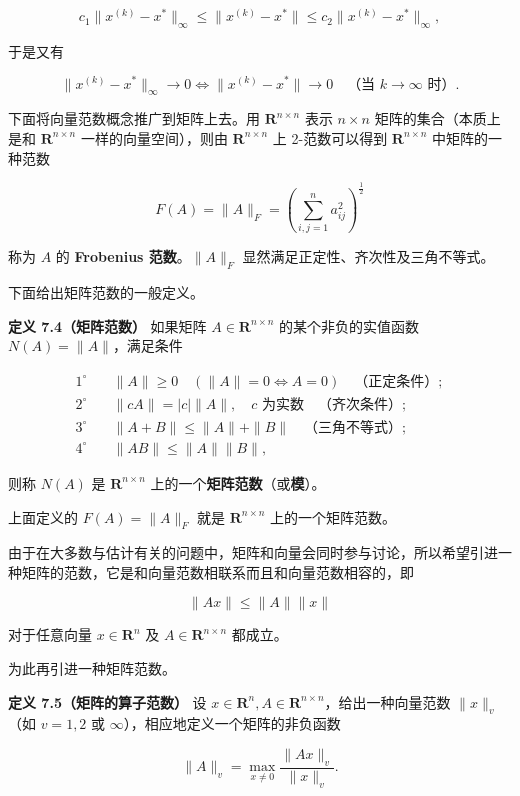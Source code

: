 \[
c_1\|x^{(k)}-x^*\|_\infty\leqslant\|x^{(k)}-x^*\|\leqslant c_2\|x^{(k)}-x^*\|_\infty,
\]

于是又有

\[
\|x^{(k)}-x^*\|_\infty\to0\Longleftrightarrow\|x^{(k)}-x^*\|\to0\quad\text{（当 }k\to\infty\text{ 时）}.
\]

下面将向量范数概念推广到矩阵上去。用 \(\mathbf R^{n\times n}\) 表示 \(n\times n\) 矩阵的集合（本质上是和 \(\mathbf R^{n\times n}\) 一样的向量空间），则由 \(\mathbf R^{n\times n}\) 上 2-范数可以得到 \(\mathbf R^{n\times n}\) 中矩阵的一种范数

\[
F(A)=\|A\|_F=\left(\sum_{i,j=1}^{n}a_{ij}^{2}\right)^{\frac12}
\]

称为 \(A\) 的 \textbf{Frobenius 范数}。\(\|A\|_F\) 显然满足正定性、齐次性及三角不等式。

下面给出矩阵范数的一般定义。

\textbf{定义 7.4（矩阵范数）} 如果矩阵 \(A\in\mathbf R^{n\times n}\) 的某个非负的实值函数 \(N(A)=\|A\|\)，满足条件

\[
\begin{aligned}
1^\circ\quad &\|A\|\geqslant0\quad(\|A\|=0\Longleftrightarrow A=0)\quad\text{（正定条件）};\\
2^\circ\quad &\|cA\|=|c|\|A\|,\quad c\text{ 为实数}\quad\text{（齐次条件）};\\
3^\circ\quad &\|A+B\|\leqslant\|A\|+\|B\|\quad\text{（三角不等式）};\\
4^\circ\quad &\|AB\|\leqslant\|A\|\|B\|,
\end{aligned}
\tag{7.5.4}
\]

则称 \(N(A)\) 是 \(\mathbf R^{n\times n}\) 上的一个\textbf{矩阵范数}（或\textbf{模}）。

上面定义的 \(F(A)=\|A\|_F\) 就是 \(\mathbf R^{n\times n}\) 上的一个矩阵范数。

由于在大多数与估计有关的问题中，矩阵和向量会同时参与讨论，所以希望引进一种矩阵的范数，它是和向量范数相联系而且和向量范数相容的，即

\[
\|Ax\|\leqslant\|A\|\|x\|
\tag{7.5.5}
\]

对于任意向量 \(x\in\mathbf R^n\) 及 \(A\in\mathbf R^{n\times n}\) 都成立。

为此再引进一种矩阵范数。

\textbf{定义 7.5（矩阵的算子范数）} 设 \(x\in\mathbf R^n,A\in\mathbf R^{n\times n}\)，给出一种向量范数 \(\|x\|_v\)（如 \(v=1,2\) 或 \(\infty\)），相应地定义一个矩阵的非负函数

\[
\|A\|_v=\max_{x\neq0}\frac{\|Ax\|_v}{\|x\|_v}.
\tag{7.5.6}
\]

